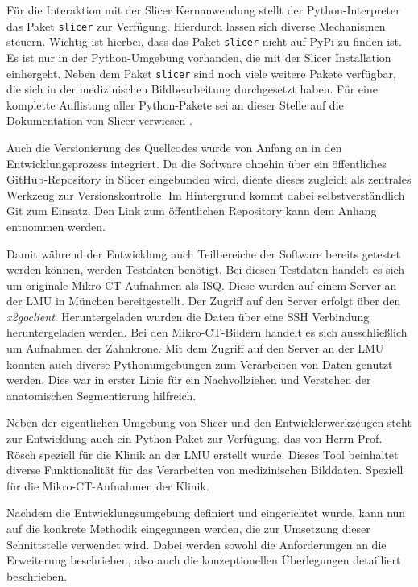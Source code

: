 Für die Interaktion mit der Slicer Kernanwendung stellt der Python-Interpreter das
Paket \texttt{slicer} zur Verfügung. Hierdurch lassen sich diverse Mechanismen steuern.
Wichtig ist hierbei, dass das Paket \texttt{slicer} nicht auf \ac{PyPi} zu finden
ist. Es ist nur in der Python-Umgebung vorhanden, die mit der Slicer Installation
einhergeht. Neben dem Paket \texttt{slicer} sind noch viele weitere Pakete verfügbar,
die sich in der medizinischen Bildbearbeitung durchgesetzt haben. Für eine komplette
Auflistung aller Python-Pakete sei an dieser Stelle auf die Dokumentation von Slicer
verwiesen \citep[vgl.][]{slicer2024}.

Auch die Versionierung des Quellcodes wurde von Anfang an in den
Entwicklungsprozess integriert. Da die Software ohnehin über ein öffentliches GitHub-Repository
in Slicer eingebunden wird, diente dieses zugleich als zentrales Werkzeug zur
Versionskontrolle. Im Hintergrund kommt dabei selbstverständlich Git zum Einsatz.
Den Link zum öffentlichen Repository kann dem Anhang entnommen werden.

Damit während der Entwicklung auch Teilbereiche der Software bereits getestet
werden können, werden Testdaten benötigt. Bei diesen Testdaten handelt es sich
um originale Mikro-\ac{CT}-Aufnahmen als \ac{ISQ}. Diese wurden auf einem Server
an der \ac{LMU} in München bereitgestellt. Der Zugriff auf den Server erfolgt über
den \textit{x2goclient}. Heruntergeladen wurden die Daten über eine \ac{SSH}
Verbindung heruntergeladen werden. Bei den Mikro-\ac{CT}-Bildern handelt es sich ausschließlich
um Aufnahmen der Zahnkrone. Mit dem Zugriff auf den Server an der \ac{LMU} konnten
auch diverse Pythonumgebungen zum Verarbeiten von Daten genutzt werden. Dies war
in erster Linie für ein Nachvollziehen und Verstehen der anatomischen
Segmentierung hilfreich.

Neben der eigentlichen Umgebung von Slicer und den Entwicklerwerkzeugen steht
zur Entwicklung auch ein Python Paket zur Verfügung, das von Herrn Prof. Rösch
speziell für die Klinik an der \ac{LMU} erstellt wurde. Dieses Tool beinhaltet
diverse Funktionalität für das Verarbeiten von medizinischen Bilddaten. Speziell
für die Mikro-\ac{CT}-Aufnahmen der Klinik.

Nachdem die Entwicklungsumgebung definiert und eingerichtet wurde, kann nun auf die
konkrete Methodik eingegangen werden, die zur Umsetzung dieser Schnittstelle
verwendet wird. Dabei werden sowohl die Anforderungen an die Erweiterung beschrieben,
also auch die konzeptionellen Überlegungen detailliert beschrieben.

